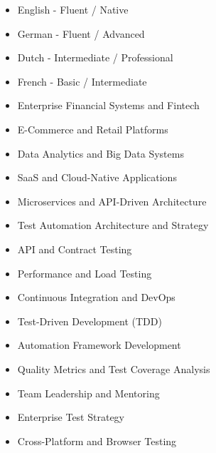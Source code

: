 \vspace{1em}
\twocolumnsection
{
\vspace{1em}
\begin{itemize}
	\item {English} - {Fluent / Native}
	\item {German} - {Fluent / Advanced}
	\item {Dutch} - {Intermediate / Professional}
	\item {French} - {Basic / Intermediate}
\end{itemize}}
{
\vspace{1em}
\begin{itemize}
	\item Enterprise Financial Systems and Fintech
	\item E-Commerce and Retail Platforms
	\item Data Analytics and Big Data Systems
	\item SaaS and Cloud-Native Applications
	\item Microservices and API-Driven Architecture
\end{itemize}}

\twocolumnsection
{
\vspace{1em}
\begin{itemize}
	\item Test Automation Architecture and Strategy
	\item API and Contract Testing
	\item Performance and Load Testing
	\item Continuous Integration and DevOps
	\item Test-Driven Development (TDD)
\end{itemize}}
{
\vspace{1em}
\begin{itemize}
	\item Automation Framework Development
	\item Quality Metrics and Test Coverage Analysis
	\item Team Leadership and Mentoring
	\item Enterprise Test Strategy
	\item Cross-Platform and Browser Testing
\end{itemize}}

